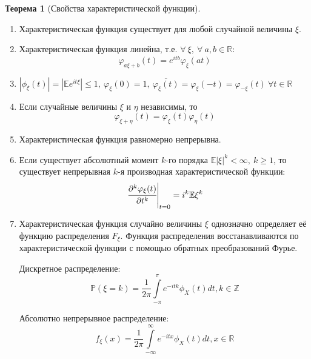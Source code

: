 \documentclass[oneside,final,14pt]{extreport}
\theoremstyle{plain}
\theoremstyle{definition}
\theoremstyle{named}
\newtheorem*{namedthm}{Теорема}
\begin{document}
\begin{namedthm}[Свойства характеристической функции]\leavevmode
    \begin{enumerate}
        \item Характеристическая функция существует для любой случайной величины $\xi$.
        \item Характеристическая функция линейна, т.е. $\forall~ \xi,~ \forall~ a, b \in \mathbb{R}$:
        \begin{equation*}
            \varphi_{a \xi + b}(t) = e^{itb} \varphi_{\xi}(at)
        \end{equation*}
        \item $|\phi_{\xi}(t)|=|\mathbb{E} e^{i t \xi}| \leqslant 1,~ \varphi_{\xi}(0) = 1, ~\overline{\varphi_{\xi}(t)} = \varphi_{\xi}(-t) = \varphi_{-\xi}(t) ~\forall t \in \mathbb{R}$
        \item Если случайные величины $\xi$ и $\eta$ независимы, то
        \begin{equation*}
            \varphi_{\xi + \eta}(t) = \varphi_{\xi}(t) \varphi_{\eta}(t)
        \end{equation*}
        \item Характеристическая функция равномерно непрерывна.
        \item Если существует абсолютный момент $k$-го порядка $\mathbb{E}|\xi|^{k} < \infty,~ k \geqslant 1$, то существует непрерывная $k$-я производная характеристической функции:
        \begin{equation*}
            \left.\cfrac{\partial^{k} \varphi_{\xi}(t)}{\partial t^{k}}\right|_{t=0}= i^{k} \mathbb{E} \xi^{k}
        \end{equation*}
        \item Характеристическая функция случайно величины $\xi$ однозначно определяет её функцию распределения $F_{\xi}$. Функция распределения восстанавливаются по характеристической функции с помощью обратных преобразований Фурье.
        
        Дискретное распределение:
        \begin{equation*}
            \mathbb{P}(\xi=k)=\frac{1}{2 \pi} \int\limits_{-\pi}^{\pi} e^{-i t k} \phi_{X}(t) d t, k \in \mathbb{Z}
        \end{equation*}
        
        Абсолютно непрерывное распределение:
        \begin{equation*}
            f_{\xi}(x)=\frac{1}{2 \pi} \int\limits_{-\infty}^{\infty} e^{-i t x} \phi_{X}(t) d t, x \in \mathbb{R}
        \end{equation*}
    \end{enumerate}
\end{namedthm}
\end{document}
